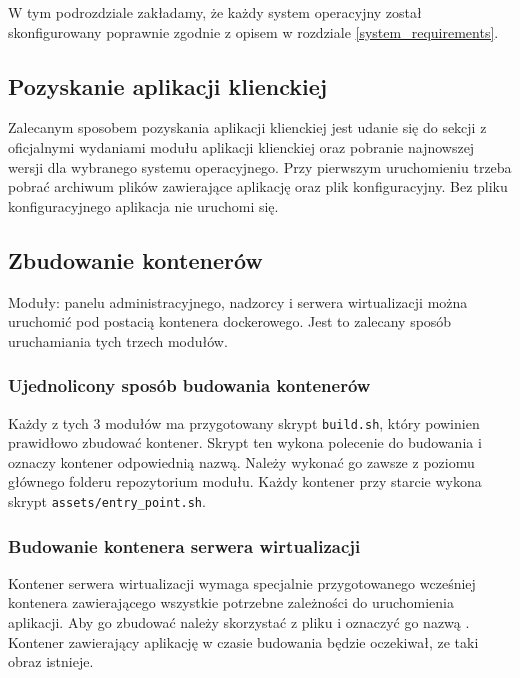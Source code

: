 \documentclass[../opis-rozwiazania.tex]{subfiles}
\begin{document}
\label{system_startup}

W tym podrozdziale zakładamy, że każdy system operacyjny został skonfigurowany poprawnie zgodnie z opisem w rozdziale \ref{system_requirements}.

\subsection{Pozyskanie aplikacji klienckiej}
\label{system_startup.client_obtaining}
Zalecanym sposobem pozyskania aplikacji klienckiej jest udanie się do sekcji z oficjalnymi wydaniami \parencite{ocd-client-releases} modułu aplikacji klienckiej oraz pobranie najnowszej wersji dla wybranego systemu operacyjnego.
Przy pierwszym uruchomieniu trzeba pobrać archiwum plików zawierające aplikację oraz plik konfiguracyjny.
Bez pliku konfiguracyjnego aplikacja nie uruchomi się.

\subsection{Zbudowanie kontenerów}
\label{system_startup.containers}

Moduły: panelu administracyjnego, nadzorcy i serwera wirtualizacji można uruchomić pod postacią kontenera dockerowego.
Jest to zalecany sposób uruchamiania tych trzech modułów.

\subsubsection{Ujednolicony sposób budowania kontenerów}
Każdy z tych 3 modułów ma przygotowany skrypt \texttt{build.sh}, który powinien prawidłowo zbudować kontener.
Skrypt ten wykona polecenie do budowania i oznaczy kontener odpowiednią nazwą.
Należy wykonać go zawsze z poziomu głównego folderu repozytorium modułu.
Każdy kontener przy starcie wykona skrypt \texttt{assets/entry\_point.sh}.

\subsubsection{Budowanie kontenera serwera wirtualizacji}
Kontener serwera wirtualizacji wymaga specjalnie przygotowanego wcześniej kontenera zawierającego wszystkie potrzebne zależności do uruchomienia aplikacji.
Aby go zbudować należy skorzystać z pliku \texttt{} i oznaczyć go nazwą \texttt{}.
Kontener zawierający aplikację w czasie budowania będzie oczekiwał, ze taki obraz istnieje.
\end{document}
